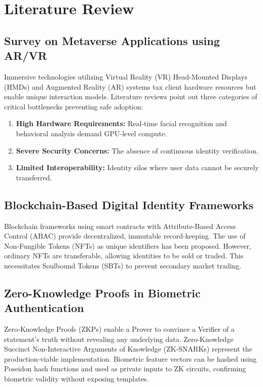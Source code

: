 \documentclass[12pt,a4paper,oneside]{report}
\begin{document}
\newpage

\chapter{Literature Review}

\section{Survey on Metaverse Applications using AR/VR}
Immersive technologies utilizing Virtual Reality (VR) Head-Mounted Displays (HMDs) and Augmented Reality (AR) systems tax client hardware resources but enable unique interaction models. Literature reviews point out three categories of critical bottlenecks preventing safe adoption:
\begin{enumerate}
    \item \textbf{High Hardware Requirements:} Real-time facial recognition and behavioral analysis demand GPU-level compute.
    \item \textbf{Severe Security Concerns:} The absence of continuous identity verification.
    \item \textbf{Limited Interoperability:} Identity silos where user data cannot be securely transferred.
\end{enumerate}

\section{Blockchain-Based Digital Identity Frameworks}
Blockchain frameworks using smart contracts with Attribute-Based Access Control (ABAC) provide decentralized, immutable record-keeping. The use of Non-Fungible Tokens (NFTs) as unique identifiers has been proposed. However, ordinary NFTs are transferable, allowing identities to be sold or traded. This necessitates Soulbound Tokens (SBTs) to prevent secondary market trading.

\section{Zero-Knowledge Proofs in Biometric Authentication}
Zero-Knowledge Proofs (ZKPs) enable a Prover to convince a Verifier of a statement's truth without revealing any underlying data. Zero-Knowledge Succinct Non-Interactive Arguments of Knowledge (ZK-SNARKs) represent the production-viable implementation. Biometric feature vectors can be hashed using Poseidon hash functions and used as private inputs to ZK circuits, confirming biometric validity without exposing templates.
\end{document}
